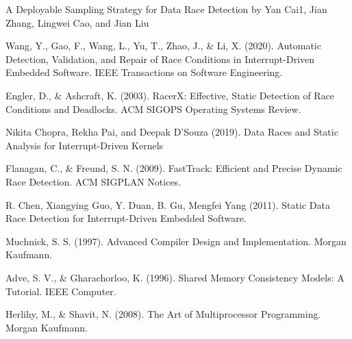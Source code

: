 \documentclass[
fancyheadings, %
%
%
]{stsreprt}
\begin{document}
A Deployable Sampling Strategy for Data Race Detection by Yan Cai1, Jian Zhang, Lingwei Cao, and Jian Liu
\begin{thebibliography}{9}
	Wang, Y., Gao, F., Wang, L., Yu, T., Zhao, J., \& Li, X. (2020). Automatic Detection, Validation, and Repair of Race Conditions in Interrupt-Driven Embedded Software. IEEE Transactions on Software Engineering.
	
	Engler, D., \& Ashcraft, K. (2003). RacerX: Effective, Static Detection of Race Conditions and Deadlocks. ACM SIGOPS Operating Systems Review.
	
	Nikita Chopra, Rekha Pai, and Deepak D’Souza (2019). Data Races and Static Analysis for Interrupt-Driven Kernels
	
	Flanagan, C., \& Freund, S. N. (2009). FastTrack: Efficient and Precise Dynamic Race Detection. ACM SIGPLAN Notices.
	
	R. Chen, Xiangying Guo, Y. Duan, B. Gu, Mengfei Yang (2011). Static Data Race Detection for Interrupt-Driven Embedded Software.
			
	Muchnick, S. S. (1997). Advanced Compiler Design and Implementation. Morgan Kaufmann.
	
	Adve, S. V., \& Gharachorloo, K. (1996). Shared Memory Consistency Models: A Tutorial. IEEE Computer.
	
	Herlihy, M., \& Shavit, N. (2008). The Art of Multiprocessor Programming. Morgan Kaufmann.
\end{thebibliography}
\end{document}
